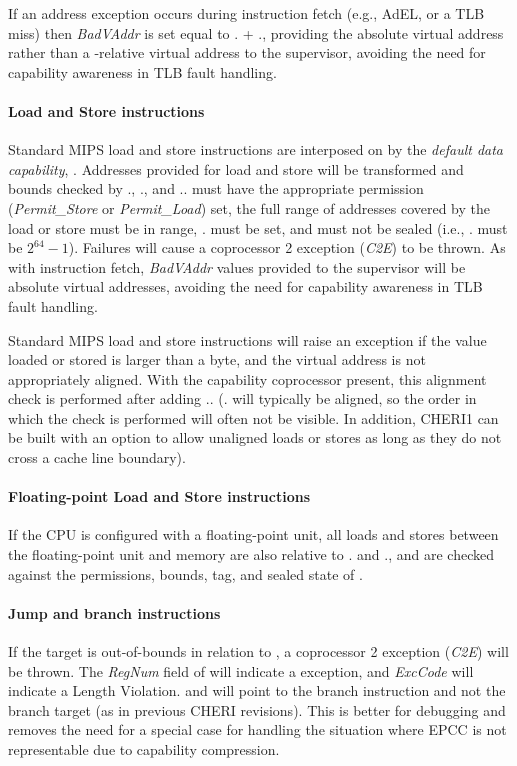 If an address exception occurs during instruction fetch (e.g., AdEL, or a TLB miss)
then \emph{BadVAddr} is set equal to \PCC{}.\cbase{} + \PCC{}.\coffset{},
providing the absolute virtual address rather than a \PCC{}-relative virtual
address to the supervisor, avoiding the need for capability awareness in TLB
fault handling.

\paragraph{Load and Store instructions}
Standard MIPS load and store instructions are interposed on by the {\em
default data capability}, \DDC{}.
Addresses provided for load and store will be transformed and bounds checked by
\DDC{}.\cbase{}, \DDC{}.\coffset{}, and \DDC{}.\clength{}.
\DDC{} must have the appropriate permission (\textit{Permit\_Store} or
\textit{Permit\_Load}) set, the full range of addresses covered by the load or
store must be in range, \DDC{}.\ctag{} must be set, and \DDC{} must not be sealed
(i.e., \DDC{}.\cotype{} must be $2^{64}-1$).
Failures will cause a coprocessor 2 exception (\textit{C2E}) to be thrown.
As with instruction fetch, \emph{BadVAddr} values provided to the supervisor
will be absolute virtual addresses, avoiding the need for capability awareness
in TLB fault handling.

Standard MIPS load and store instructions will raise an exception if the
value loaded or stored is larger than a byte, and the virtual address is
not appropriately aligned. With the capability coprocessor present, this
alignment check is performed after adding \DDC{}.\cbase{}. (\DDC{}.\cbase{}
will typically be aligned, so the order in which the check is performed will
often not be visible. In addition, CHERI1 can be built with an option to
allow unaligned loads or stores as long as they do not cross a cache line
boundary).

\paragraph{Floating-point Load and Store instructions}
If the CPU is configured with a floating-point unit, all loads and stores
between the floating-point unit and memory are also relative to
\DDC{}.\cbase{} and \DDC{}.\coffset{}, and are checked against the
permissions, bounds, tag, and sealed state of \DDC{}.

\paragraph{Jump and branch instructions}
If the target is out-of-bounds in relation to \emph{\PCC{}}, a coprocessor 2
exception (\textit{C2E}) will be thrown.
The \emph{RegNum} field of \capcausereg{} will indicate a \PCC{} exception, and
\emph{ExcCode} will indicate a Length Violation.
\EPC{} and \EPCC{} will point to the branch instruction and not the branch
target (as in previous CHERI revisions). This is better for debugging
and removes the need for a special case for handling the situation where EPCC
is not representable due to capability compression. 

